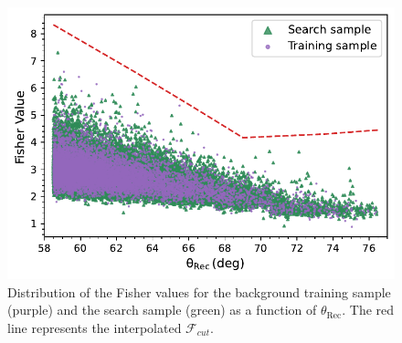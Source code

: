 \begin{figure}[t!]
  \centering
  \includegraphics[width=14.5cm]{thesis_figures/Nu_analysis/Fisher_plots/Fisher_comp_bkg_search_wnt.pdf}
  \caption{Distribution of the Fisher values for the background training sample (purple) and the search sample (green) as a function of $\theta_{\text{Rec}}$. The red line represents the interpolated $\mathcal{F}_{cut}$.}
  \label{fig:Fish_bkg_search}
\end{figure}

